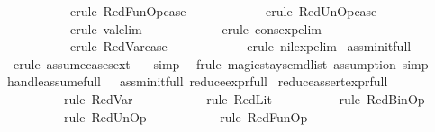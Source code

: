\begin{isabellebody}
\ \ \ \ \ \ \ \ \ \ \ erule\ RedFunOp{\isacharunderscore}{\kern0pt}case\ {\isacharbar}{\kern0pt}\isanewline
\ \ \ \ \ \ \ \ \ \ \ erule\ RedUnOp{\isacharunderscore}{\kern0pt}case\ {\isacharbar}{\kern0pt}\isanewline
\ \ \ \ \ \ \ \ \ \ \ erule\ val{\isacharunderscore}{\kern0pt}elim\ {\isacharbar}{\kern0pt}\isanewline
\ \ \ \ \ \ \ \ \ \ \ erule\ cons{\isacharunderscore}{\kern0pt}exp{\isacharunderscore}{\kern0pt}elim{}\ {\isacharbar}{\kern0pt}\ \isanewline
\ \ \ \ \ \ \ \ \ \ \ erule\ RedVar{\isacharunderscore}{\kern0pt}case\ {\isacharbar}{\kern0pt}\isanewline
\ \ \ \ \ \ \ \ \ \ \ erule\ nil{\isacharunderscore}{\kern0pt}exp{\isacharunderscore}{\kern0pt}elim{\isacharparenright}{\kern0pt}{\isacharparenright}{\kern0pt}{\isacharplus}{\kern0pt}\isanewline
\isanewline
{}\isamarkupfalse%
\ assm{\isacharunderscore}{\kern0pt}init{\isacharunderscore}{\kern0pt}full\ {\isacharequal}{\kern0pt}\ \isanewline
\ {\isacharparenleft}{\kern0pt}\ erule\ assume{\isacharunderscore}{\kern0pt}cases{\isacharunderscore}{\kern0pt}ext{\isacharunderscore}{\kern0pt}{}{\isacharcomma}{\kern0pt}\isanewline
\ \ \ simp{\isacharquery}{\kern0pt}{\isacharcomma}{\kern0pt}\isanewline
\ \ {\isacharparenleft}{\kern0pt}{\isacharparenleft}{\kern0pt}frule\ magic{\isacharunderscore}{\kern0pt}stays{\isacharunderscore}{\kern0pt}cmd{\isacharunderscore}{\kern0pt}list{\isacharunderscore}{\kern0pt}{}{\isacharparenright}{\kern0pt}{\isacharcomma}{\kern0pt}\ assumption{\isacharcomma}{\kern0pt}\ simp{\isacharparenright}{\kern0pt}{\isacharparenright}{\kern0pt}\isanewline
\isanewline
{}\isamarkupfalse%
\ handle{\isacharunderscore}{\kern0pt}assume{\isacharunderscore}{\kern0pt}full\ {\isacharequal}{\kern0pt}\ {\isacharparenleft}{\kern0pt}\ assm{\isacharunderscore}{\kern0pt}init{\isacharunderscore}{\kern0pt}full{\isacharcomma}{\kern0pt}\ reduce{\isacharunderscore}{\kern0pt}expr{\isacharunderscore}{\kern0pt}full{\isacharparenright}{\kern0pt}\isanewline
\isanewline
{}\isamarkupfalse%
\ reduce{\isacharunderscore}{\kern0pt}assert{\isacharunderscore}{\kern0pt}expr{\isacharunderscore}{\kern0pt}full\ {\isacharequal}{\kern0pt}\ \isanewline
\ \ {\isacharparenleft}{\kern0pt}{\isacharparenleft}{\kern0pt}\isanewline
\ \ \ \ \ \ \ \ \ \ {\isacharparenleft}{\kern0pt}rule\ RedVar\ {\isacharbar}{\kern0pt}\isanewline
\ \ \ \ \ \ \ \ \ \ rule\ RedLit{\isacharbar}{\kern0pt}\isanewline
\ \ \ \ \ \ \ \ \ \ rule\ RedBinOp\ {\isacharbar}{\kern0pt}\isanewline
\ \ \ \ \ \ \ \ \ \ rule\ RedUnOp\ {\isacharbar}{\kern0pt}\isanewline
\ \ \ \ \ \ \ \ \ \ rule\ RedFunOp\ {\isacharbar}{\kern0pt}\isanewline

\end{isabellebody}
